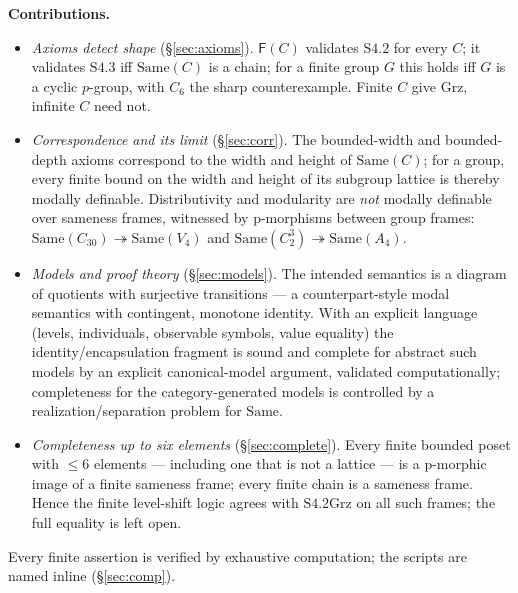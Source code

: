 \documentclass[11pt]{amsart}
\theoremstyle{definition}
\newcommand{\Same}{\mathrm{Same}}
\newcommand{\Fr}{\mathsf{F}}
\newcommand{\Grz}{\mathrm{Grz}}
\begin{document}
\medskip\noindent\textbf{Contributions.}
\begin{itemize}
\item[(1)] \emph{Axioms detect shape} (\S\ref{sec:axioms}). $\Fr(C)$ validates
$\mathrm{S4.2}$ for every $C$; it validates $\mathrm{S4.3}$ iff $\Same(C)$ is a
chain; for a finite group $G$ this holds iff $G$ is a cyclic $p$-group, with
$C_6$ the sharp counterexample. Finite $C$ give $\Grz$, infinite $C$ need not.
\item[(2)] \emph{Correspondence and its limit} (\S\ref{sec:corr}). The
bounded-width and bounded-depth axioms correspond to the width and height of
$\Same(C)$; for a group, every finite bound on the width and height of its
subgroup lattice is thereby modally definable.
Distributivity and modularity are \emph{not} modally definable over sameness
frames, witnessed by p-morphisms between group frames:
$\Same(C_{30})\twoheadrightarrow\Same(V_4)$ and $\Same(C_2^3)\twoheadrightarrow
\Same(A_4)$.
\item[(3)] \emph{Models and proof theory} (\S\ref{sec:models}). The intended
semantics is a diagram of quotients with surjective transitions --- a
counterpart-style modal semantics with contingent, monotone identity. With an
explicit language (levels, individuals, observable symbols, value equality) the
identity/encapsulation fragment is sound and complete for abstract such models
by an explicit canonical-model argument, validated computationally;
completeness for the
category-generated models is controlled by a realization/separation problem
for $\Same$.
\item[(4)] \emph{Completeness up to six elements} (\S\ref{sec:complete}). Every
finite bounded poset with $\le 6$ elements --- including one that is not a
lattice --- is a p-morphic image of a finite sameness frame; every finite chain
is a sameness frame. Hence the finite level-shift logic agrees with
$\mathrm{S4.2Grz}$ on all such frames; the full equality is left open.
\end{itemize}
Every finite assertion is verified by exhaustive computation; the scripts are
named inline (\S\ref{sec:comp}).
\end{document}
